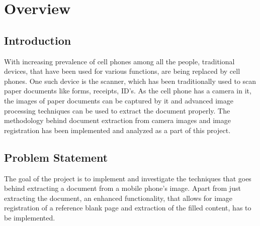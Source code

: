 
\chapter{Overview} %

\label{Chapter1} %


\newcommand{\keyword}[1]{\textbf{#1}}
\newcommand{\tabhead}[1]{\textbf{#1}}
\newcommand{\code}[1]{\texttt{#1}}
\newcommand{\file}[1]{\texttt{\bfseries#1}}
\newcommand{\option}[1]{\texttt{\itshape#1}}


\section{Introduction}
With increasing prevalence of cell phones among all the people, traditional devices, that have been used for various functions, are being replaced by cell phones. One such device is the scanner, which has been traditionally used to scan paper documents like forms, receipts, ID's. As the cell phone has a camera in it, the images of paper documents can be captured by it and advanced image processing techniques can be used to extract the document properly. The methodology behind document extraction from camera images and image registration has been implemented and analyzed as a part of this project.


\section{Problem Statement}

The goal of the project is to implement and investigate the techniques that goes behind extracting a document from a mobile phone's image. Apart from just extracting the document, an enhanced functionality, that allows for image registration of a reference blank page and extraction of the filled content, has to be implemented.
 
